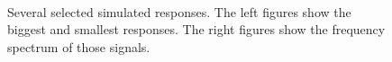 \begin{figure}
	\\
	\caption{Several selected simulated responses. The left figures show the biggest and smallest responses. The right figures show the frequency spectrum of those signals.\label{modelplots}}
\end{figure}

